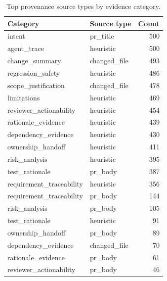 \begin{table}[t]
\centering
\caption{Top provenance source types by evidence category.}
\label{tab:source-type-by-category}
\footnotesize
\begin{tabular}{@{}llr@{}}
\toprule
Category & Source type & Count \\
\midrule
intent & pr\_title & 500 \\
agent\_trace & heuristic & 500 \\
change\_summary & changed\_file & 493 \\
regression\_safety & heuristic & 486 \\
scope\_justification & changed\_file & 478 \\
limitations & heuristic & 469 \\
reviewer\_actionability & heuristic & 454 \\
rationale\_evidence & heuristic & 439 \\
dependency\_evidence & heuristic & 430 \\
ownership\_handoff & heuristic & 411 \\
risk\_analysis & heuristic & 395 \\
test\_rationale & pr\_body & 387 \\
requirement\_traceability & heuristic & 356 \\
requirement\_traceability & pr\_body & 144 \\
risk\_analysis & pr\_body & 105 \\
test\_rationale & heuristic & 91 \\
ownership\_handoff & pr\_body & 89 \\
dependency\_evidence & changed\_file & 70 \\
rationale\_evidence & pr\_body & 61 \\
reviewer\_actionability & pr\_body & 46 \\
\bottomrule
\end{tabular}
\end{table}
